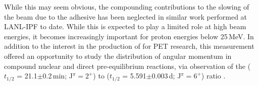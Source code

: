 While this may seem obvious, the compounding contributions to the slowing of the beam due to the adhesive has been neglected in similar work performed at LANL-IPF to date. 
While this is expected to play a limited role at high beam energies, it becomes increasingly important for proton energies below 25\,MeV.
In addition to the interest in the production of  for PET research, this measurement  offered an opportunity to study the distribution of angular momentum in compound nuclear and direct pre-equilibrium reactions, via observation of the  ($t_{1/2}$ = 21.1$\pm$0.2\,min; J$^\pi=2^+$) to  ($t_{1/2}$ = 5.591$\pm$0.003\,d; J$^\pi=6^+$)   ratio \cite{Dong2015,Wang2017}.






% 


\vspace{1cm}



